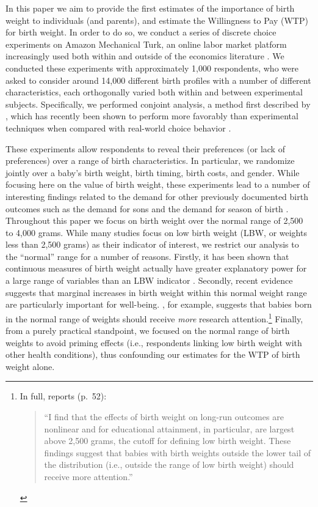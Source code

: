 \documentclass[a4paper, 11pt]{article}
\begin{document}
\begin{spacing}{1.4}
In this paper we aim to provide the first estimates of the importance of
birth weight to individuals (and parents), and estimate the Willingness to Pay (WTP)
for birth weight.
In order to do so, we conduct a series of discrete choice experiments
on Amazon Mechanical Turk, an online labor market platform increasingly used both
within and outside of the economics literature \citep{Kuziemkoetal2015,
  Jordanetal2016}.  We conducted these experiments with approximately
1,000 respondents, who were asked to consider around 14,000
different birth profiles with a number
of different characteristics, each orthogonally varied both within and
between experimental subjects.  Specifically, we performed conjoint analysis,
a method first described by \citet{Lancaster1966}, which has recently
been shown to perform more favorably than experimental techniques when
compared with real-world choice behavior \citep{Hainmuelleretal2015}.

These experiments allow respondents to reveal their preferences (or lack
of preferences) over a range of birth characteristics.  In particular, we
randomize jointly over a baby's birth weight, birth timing, birth costs,
and gender.  While focusing here on the value of birth weight, these
experiments lead to a number of interesting findings related to the
demand for other previously documented birth outcomes such as the demand
for sons \citep{DahlMoretti2008} and the demand for season of birth
\citep{Clarkeetal2016}.  Throughout this paper
we focus on birth weight over the normal range of 2,500 to 4,000 grams.
While many studies focus on low birth weight (LBW, or weights less than
2,500 grams) as their indicator of interest, we restrict our analysis
to the ``normal'' range for a number of reasons.  Firstly, it has been
shown that continuous measures of birth weight actually have greater
explanatory power for a large range of variables than an LBW indicator
\citep{Blacketal2007}.  Secondly, recent evidence suggests that marginal
increases in birth weight within
this normal weight range are particularly important for well-being.  \citet{Royer2009}, for example, suggests that
babies born in the normal range of weights should receive \emph{more}
research attention.\footnote{In full, \citep{Royer2009} reports (p.\ 52):
  \begin{quote} ``I find that the effects of birth weight on long-run
    outcomes are nonlinear and for educational attainment, in particular,
    are largest above 2,500 grams, the cutoff for defining low birth weight.
    These findings suggest that babies with birth weights outside the
    lower tail of the distribution (i.e., outside the range of low birth
    weight) should receive more attention.''
  \end{quote}
}
  Finally, from a purely practical standpoint, we focused on the
normal range of birth weights to avoid priming effects (i.e., respondents linking low birth
weight with other health conditions), thus confounding our estimates
for the WTP of birth weight alone.


\end{spacing}
\end{document}
